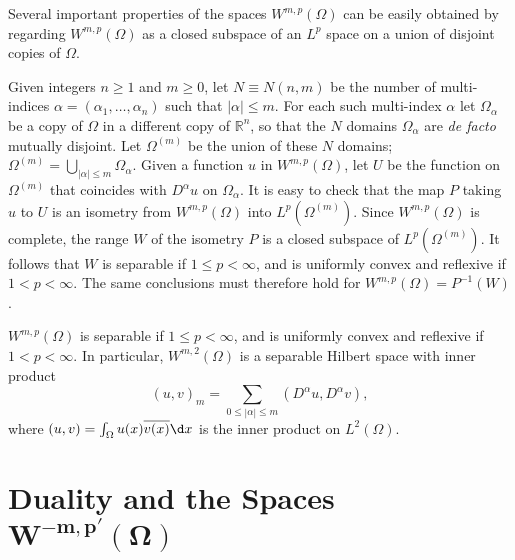 \begin{para}
  Several important properties of the spaces $W^{m, p}(\Omega)$ can be easily obtained by 
  regarding $W^{m, p}(\Omega)$ as a closed subspace of an $L^p$ space on a union of disjoint 
  copies of $\Omega$.
  
  Given integers $n \geq 1$ and $m \geq 0$, let $N \equiv N(n, m)$ be the number of multi-indices 
  $\alpha=\left(\alpha_1, \ldots, \alpha_n\right)$ such that $|\alpha| \leq m$. For each such 
  multi-index $\alpha$ let $\Omega_\alpha$ be a copy of $\Omega$ in a different copy of
  $\mathbb{R}^n$, so that the $N$ domains $\Omega_\alpha$ are \emph{de facto} mutually disjoint.
  Let $\Omega^{(m)}$ be the union of these $N$ domains;
  $\Omega^{(m)}=\bigcup_{|\alpha| \leq m} \Omega_\alpha$.
  Given a function $u$ in $W^{m, p}(\Omega)$, let $U$ be the function on $\Omega^{(m)}$ that 
  coincides with $D^\alpha u$ on $\Omega_\alpha$. It is easy to check that the map $P$ taking $u$ 
  to $U$ is an isometry from $W^{m, p}(\Omega)$ into $L^p(\Omega^{(m)})$.
  Since $W^{m, p}(\Omega)$ is complete, the range $W$ of the isometry $P$ is a closed subspace of 
  $L^p(\Omega^{(m)})$. It follows that $W$ is separable if $1 \leq p<\infty$,
  and is uniformly convex and reflexive if $1<p<\infty$. The same conclusions must therefore hold 
  for $W^{m, p}(\Omega)=P^{-1}(W)$.
\end{para}


\begin{theorem}
  $W^{m, p}(\Omega)$ is separable if $1 \leq p<\infty$, and is uniformly convex and reflexive if 
  $1<p<\infty$. In particular, $W^{m, 2}(\Omega)$ is a separable Hilbert space with inner product
  \[(u, v)_m=\sum_{0 \leq|\alpha| \leq m}\left(D^\alpha u, D^\alpha v\right),\]
  where $(u, v)=\int_{\Omega} u(x) \overline{v(x)} \d x$ is the inner product on $L^2(\Omega)$.
\end{theorem}


\section[Duality and the Spaces $W^{-m,p'}(\Omega)$]%
  {Duality and the Spaces $\bm{W^{-m,p'}(\Omega)}$}


